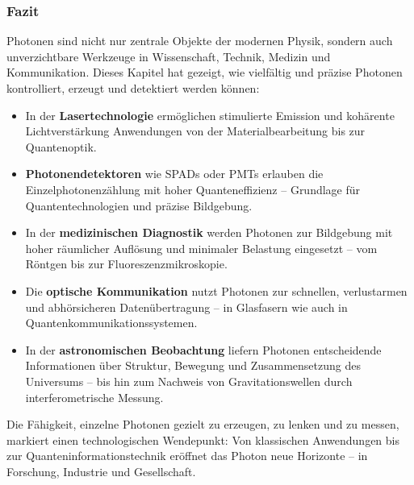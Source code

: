 \subsubsection{Fazit}

Photonen sind nicht nur zentrale Objekte der modernen Physik, sondern auch unverzichtbare Werkzeuge in Wissenschaft, Technik, Medizin und Kommunikation. Dieses Kapitel hat gezeigt, wie vielfältig und präzise Photonen kontrolliert, erzeugt und detektiert werden können:

\begin{itemize}
	\item In der \textbf{Lasertechnologie} ermöglichen stimulierte Emission und kohärente Lichtverstärkung Anwendungen von der Materialbearbeitung bis zur Quantenoptik.
	\item \textbf{Photonendetektoren} wie SPADs oder PMTs erlauben die Einzelphotonenzählung mit hoher Quanteneffizienz – Grundlage für Quantentechnologien und präzise Bildgebung.
	\item In der \textbf{medizinischen Diagnostik} werden Photonen zur Bildgebung mit hoher räumlicher Auflösung und minimaler Belastung eingesetzt – vom Röntgen bis zur Fluoreszenzmikroskopie.
	\item Die \textbf{optische Kommunikation} nutzt Photonen zur schnellen, verlustarmen und abhörsicheren Datenübertragung – in Glasfasern wie auch in Quantenkommunikationssystemen.
	\item In der \textbf{astronomischen Beobachtung} liefern Photonen entscheidende Informationen über Struktur, Bewegung und Zusammensetzung des Universums – bis hin zum Nachweis von Gravitationswellen durch interferometrische Messung.
\end{itemize}

Die Fähigkeit, einzelne Photonen gezielt zu erzeugen, zu lenken und zu messen, markiert einen technologischen Wendepunkt: Von klassischen Anwendungen bis zur Quanteninformationstechnik eröffnet das Photon neue Horizonte – in Forschung, Industrie und Gesellschaft.



